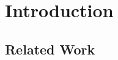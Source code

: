 \section{Introduction}
\label{sec:introduction}


\subsection{Related Work}
\label{subsec:related_work}
